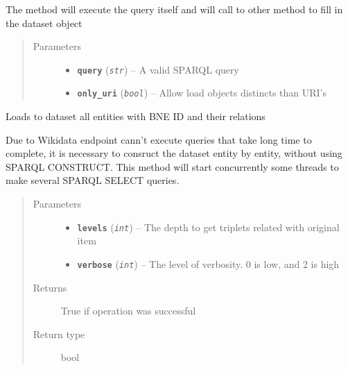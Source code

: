 \documentclass[letterpaper,10pt,english]{sphinxmanual}
\begin{document}
\begin{fulllineitems}
\begin{fulllineitems}
The method will execute the query itself and will call to other method
to fill in the dataset object
\begin{quote}\begin{description}
\item[{Parameters}] \leavevmode\begin{itemize}
\item {} 
\textbf{\texttt{query}} (\emph{\texttt{str}}) -- A valid SPARQL query

\item {} 
\textbf{\texttt{only\_uri}} (\emph{\texttt{bool}}) -- Allow load objects distincts than URI's

\end{itemize}

\end{description}\end{quote}

\end{fulllineitems}


\begin{fulllineitems}
\label{index:dataset.Dataset.load_dataset_recurrently}
Loads to dataset all entities with BNE ID and their relations

Due to Wikidata endpoint cann't execute queries that take long time
to complete, it is necessary to consruct the dataset entity by entity,
without using SPARQL CONSTRUCT. This method will start concurrently
some threads to make several SPARQL SELECT queries.
\begin{quote}\begin{description}
\item[{Parameters}] \leavevmode\begin{itemize}
\item {} 
\textbf{\texttt{levels}} (\emph{\texttt{int}}) -- The depth to get triplets related with original item

\item {} 
\textbf{\texttt{verbose}} (\emph{\texttt{int}}) -- The level of verbosity. 0 is low, and 2 is high

\end{itemize}

\item[{Returns}] \leavevmode
True if operation was successful

\item[{Return type}] \leavevmode
bool


\end{description}
\end{quote}
\end{fulllineitems}
\end{fulllineitems}
\end{document}
